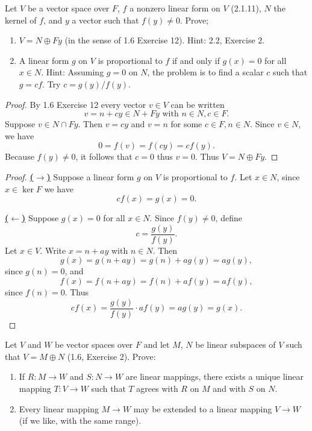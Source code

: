 \begin{tcolorbox}[title=Problem 16, breakable]
    Let $V$ be a vector space over $F$, $f$ a nonzero 
    linear form on $V$ (2.1.11), $N$ the kernel of $f$,
    and $y$ a vector such that $f(y) \ne 0$. Prove;
    \begin{enumerate}
        \item $V = N \oplus Fy$ (in the sense of 1.6 Exercise 12).
        {Hint: 2.2, Exercise 2.}
        \item A linear form $g$ on $V$ is proportional to $f$ if and only if 
        $g(x) = 0$ for all $x \in N$.
        {Hint: Assuming $g = 0$ on $N$, the problem is to find a scalar $c$ such that 
        $g = cf$. Try $c = g(y) / f(y)$.}
    \end{enumerate}
\end{tcolorbox}

\begin{proof}
    By 1.6 Exercise 12 every vector $v \in V$ can be written 
    \[v = n + cy \in N + Fy \text{ with } n \in N, c \in F.\]
    Suppose $v \in N \cap Fy$.
    Then $v = cy$ and $v = n$ for some $c \in F, n \in N$.
    Since $v \in N$, we have
    \[
        0 = f(v) = f(cy) = c f(y).
    \]
    Because $f(y) \ne 0$, it follows that $c = 0$ thus $v = 0$.
    Thus $V = N \oplus Fy$.
\end{proof}

\begin{proof}
    \underline{\textbf{($\longrightarrow$)}}
    Suppose a linear form $g$ on $V$ is proportional to $f$.
    Let $x \in N$, since $x \in \ker F$ we have  
    \[c f(x) = g(x) = 0.\]

    \underline{\textbf{($\longleftarrow$)}} 
    Suppose $g(x) = 0$ for all $x \in N$.
    Since $f(y) \ne 0$, define
    \[
    c = \frac{g(y)}{f(y)}.
    \]
    Let $x \in V$. Write $x = n + ay$ with $n \in N$.
    Then
    \[
    g(x) = g(n + ay) = g(n) + a g(y) = a g(y),
    \]
    since $g(n)=0$, and
    \[
    f(x) = f(n + ay) = f(n) + a f(y) = a f(y),
    \]
    since $f(n)=0$.
    Thus
    \[
    c f(x) = \frac{g(y)}{f(y)} \cdot a f(y) = a g(y) = g(x).
    \]
\end{proof}


\begin{tcolorbox}[title=Problem 18, breakable]
    Let $V$ and $W$ be vector spaces over $F$
    and let $M$, $N$ be linear subspaces of $V$
    such that $V = M \oplus N$ (1.6, Exercise 2). Prove:
    \begin{enumerate}
        \item If $R : M \longrightarrow W$ and $S : N \longrightarrow W$
        are linear mappings, there exists a unique linear mapping $T : V \longrightarrow W$
        such that $T$ agrees with $R$ on $M$ and with $S$ on $N$.
        \item Every linear mapping $M \longrightarrow W$ 
        may be extended to a linear mapping $V \longrightarrow W$
        (if we like, with the same range).
    \end{enumerate}
\end{tcolorbox}

